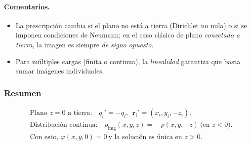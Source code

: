 \documentclass{article}
\begin{document}
\paragraph{Comentarios.}
\begin{itemize}
\item La prescripción cambia si el plano no está a tierra (Dirichlet no nula) o si se imponen condiciones de Neumann; en el caso clásico de plano \emph{conectado a tierra}, la imagen es siempre \emph{de signo opuesto}.
\item Para múltiples cargas (finita o continua), la \emph{linealidad} garantiza que basta sumar imágenes individuales.
\end{itemize}

\subsubsection*{Resumen}
\[
\boxed{
\begin{aligned}
&\text{Plano } z=0 \text{ a tierra:}\quad q_i'=-q_i,\ \ \mathbf r_i'=(x_i,y_i,-z_i).\\[4pt]
&\text{Distribución continua:}\quad \rho_{\text{img}}(x,y,z)=-\,\rho(x,y,-z)\ \text{(en }z<0\text{)}.\\[4pt]
&\text{Con esto, }\varphi(x,y,0)=0\ \text{y la solución es única en }z>0.
\end{aligned}}
\]
\end{document}

